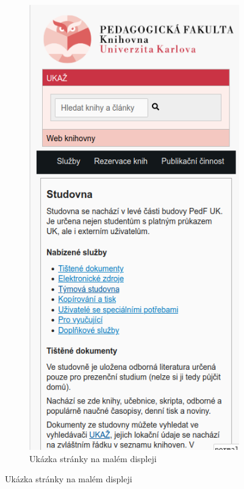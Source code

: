 \documentclass{csbulletin}
\begin{document}
\begin{figure}[htbp]
\begin{subfigure}[t]{0.24\textwidth}
    \includegraphics[width=\textwidth]{img/pedf-web-small.png}
    \caption{Ukázka stránky na malém displeji}
\end{subfigure}
\end{figure}
\end{document}
